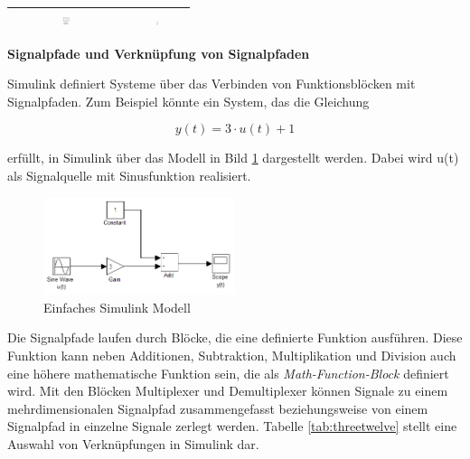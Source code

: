 \begin{table}[H]
{\begin{tabular}{| c | c | c | c |}
\parbox[c][0.9in][c]{1.6in}{} &
\parbox[c][0.9in][c]{1.5in}{\centerline{\includegraphics[width=0.1\textwidth]{Kapitel2/Table/image7.png}}} &
\parbox[c][0.9in][c]{1.6in}{} &
\parbox[c][0.9in][c]{1.5in}{\centerline{\includegraphics[width=0.07\textwidth]{Kapitel2/Table/image8.png}}}\\ \hline

\end{tabular}%
}\bigskip
\label{tab:threeeleven}
\end{table}

\medskip

{\selectfont
\noindent\textbf{Signalpfade und Verknüpfung von Signalpfaden}}

\noindent Simulink definiert Systeme über das Verbinden von Funktionsblöcken mit Signalpfaden. Zum Beispiel könnte ein System, das die Gleichung

\begin{equation}\label{eq:threetwohundredten}
y(t) = 3 \cdot u(t) + 1
\end{equation}

\noindent erfüllt, in Simulink über das Modell in Bild \ref{fig:SimulinkModell} dargestellt werden. Dabei wird u(t) als Signalquelle mit Sinusfunktion realisiert.

\begin{figure}[H]
  \centerline{\includegraphics[width=0.5\textwidth]{Kapitel2/Bilder/image33}}
  \caption{Einfaches Simulink Modell}
  \label{fig:SimulinkModell}
\end{figure}

\noindent Die Signalpfade laufen durch Blöcke, die eine definierte Funktion ausführen. Diese Funktion kann neben Additionen, Subtraktion, Multiplikation und Division auch eine höhere mathematische Funktion sein, die als \textit{Math-Function-Block} definiert wird. Mit den Blöcken Multiplexer und Demultiplexer können Signale zu einem mehrdimensionalen Signalpfad zusammengefasst beziehungsweise von einem Signalpfad in einzelne Signale zerlegt werden. Tabelle \ref{tab:threetwelve} stellt eine Auswahl von Verknüpfungen in Simulink dar.

